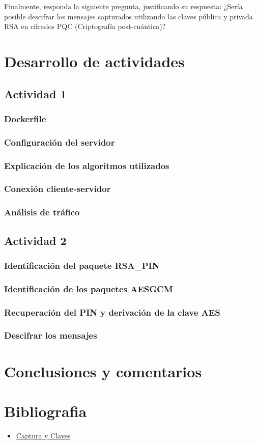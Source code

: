 \documentclass[letter,12pt]{article}
\begin{document}
Finalmente, responda la siguiente pregunta, justificando su respuesta: ¿Sería posible descifrar los mensajes capturados utilizando las claves pública y privada RSA en cifrados PQC (Criptografía post-cuántica)?

\section{Desarrollo de actividades}

\subsection{Actividad 1}
    \subsubsection{Dockerfile}
    \subsubsection{Configuración del servidor}
    \subsubsection{Explicación de los algoritmos utilizados}
    \subsubsection{Conexión cliente-servidor}
    \subsubsection{Análisis de tráfico}

\subsection{Actividad 2}
    \subsubsection{Identificación del paquete RSA\_PIN}
    \subsubsection{Identificación de los paquetes AESGCM}
    \subsubsection{Recuperación del PIN y derivación de la clave AES}
    \subsubsection{Descifrar los mensajes}

\section*{Conclusiones y comentarios}

\section{Bibliografia}
\begin{itemize}
    \item \href{https://drive.google.com/drive/folders/1rXMp5y9WeBR36iytc4RBaqXKWf3ea-WU} {Captura y Claves}
\end{itemize}
\end{document}
